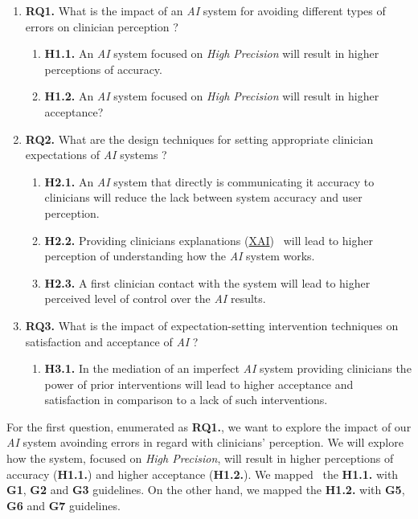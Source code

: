\begin{enumerate}
\item {\bf RQ1.} What is the impact of an {\it AI} system for avoiding different types of errors on clinician perception ?
\begin{enumerate}
\item {\bf H1.1.} An {\it AI} system focused on {\it High Precision} will result in higher perceptions of accuracy.
\item {\bf H1.2.} An {\it AI} system focused on {\it High Precision} will result in higher acceptance?
\end{enumerate}
\item {\bf RQ2.} What are the design techniques for setting appropriate clinician expectations of {\it AI} systems ?
\begin{enumerate}
\item {\bf H2.1.} An {\it AI} system that directly is communicating it accuracy to clinicians will reduce the lack between system accuracy and user perception. 
\item {\bf H2.2.} Providing clinicians explanations (\hyperlink{https://www.darpa.mil/program/explainable-artificial-intelligence}{XAI})~\cite{gunning2017explainable, holzinger2017we} will lead to higher perception of understanding how the {\it AI} system works.
\item {\bf H2.3.} A first clinician contact with the system will lead to higher perceived level of control over the {\it AI} results.
\end{enumerate}
\item {\bf RQ3.} What is the impact of expectation-setting intervention techniques on satisfaction and acceptance of {\it AI} ?
\begin{enumerate}
\item {\bf H3.1.} In the mediation of an imperfect {\it AI} system providing clinicians the power of prior interventions will lead to higher acceptance and satisfaction in comparison to a lack of such interventions.
\end{enumerate}
\end{enumerate}

For the first question, enumerated as {\bf RQ1.}, we want to explore the impact of our {\it AI} system avoinding errors in regard with clinicians' perception. We will explore how the system, focused on {\it High Precision}, will result in higher perceptions of accuracy ({\bf H1.1.}) and higher acceptance ({\bf H1.2.}). We mapped~\cite{amershi2019guidelines} the {\bf H1.1.} with {\bf G1}, {\bf G2} and {\bf G3} guidelines. On the other hand, we mapped the {\bf H1.2.} with {\bf G5}, {\bf G6} and {\bf G7} guidelines.

